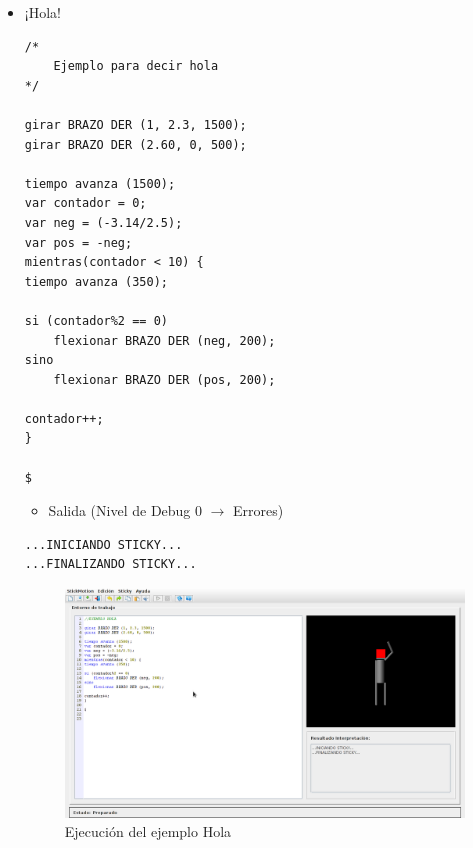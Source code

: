 \documentclass[a4paper, 12pt]{book}
\begin{document}
\begin{itemize}
  
\item ¡Hola!\\
  

  
\begin{verbatim}
/*
    Ejemplo para decir hola
*/

girar BRAZO DER (1, 2.3, 1500);
girar BRAZO DER (2.60, 0, 500);

tiempo avanza (1500);
var contador = 0;
var neg = (-3.14/2.5);
var pos = -neg;
mientras(contador < 10) {
tiempo avanza (350);

si (contador%2 == 0)
    flexionar BRAZO DER (neg, 200);
sino 
    flexionar BRAZO DER (pos, 200);
    
contador++;
}

$
\end{verbatim}
  

  
  \begin{itemize}
  \item Salida (Nivel de Debug 0 $\rightarrow$ Errores)
  \end{itemize}
\begin{verbatim}
...INICIANDO STICKY...
...FINALIZANDO STICKY...
\end{verbatim}
  
  
  
  \begin{figure}[htb]
    \centerline{\includegraphics[width=\textwidth]{./imagenes/hola.png}}
    \caption{Ejecución del ejemplo Hola}
  \end{figure}
  

\end{itemize}
\end{document}
